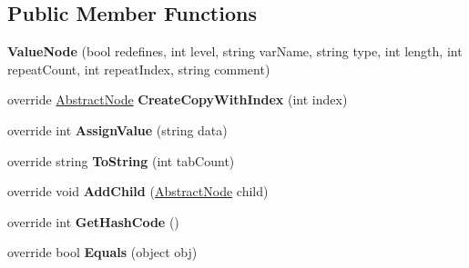 \subsection*{Public Member Functions}
\begin{DoxyCompactItemize}
\item 
{\bfseries Value\+Node} (bool redefines, int level, string var\+Name, string type, int length, int repeat\+Count, int repeat\+Index, string comment)\hypertarget{class__1920_parser_1_1_value_node_a5070c8591d364b184fb2f7a83098d1df}{}\label{class__1920_parser_1_1_value_node_a5070c8591d364b184fb2f7a83098d1df}

\item 
override \hyperlink{class__1920_parser_1_1_abstract_node}{Abstract\+Node} {\bfseries Create\+Copy\+With\+Index} (int index)\hypertarget{class__1920_parser_1_1_value_node_a9419a8beace8e6eda482fc3a403daf4b}{}\label{class__1920_parser_1_1_value_node_a9419a8beace8e6eda482fc3a403daf4b}

\item 
override int {\bfseries Assign\+Value} (string data)\hypertarget{class__1920_parser_1_1_value_node_a21bed203f8124c630e8b804ebcd7b728}{}\label{class__1920_parser_1_1_value_node_a21bed203f8124c630e8b804ebcd7b728}

\item 
override string {\bfseries To\+String} (int tab\+Count)\hypertarget{class__1920_parser_1_1_value_node_ae2b512cbab33936e1b02d7a7acf3b4bd}{}\label{class__1920_parser_1_1_value_node_ae2b512cbab33936e1b02d7a7acf3b4bd}

\item 
override void {\bfseries Add\+Child} (\hyperlink{class__1920_parser_1_1_abstract_node}{Abstract\+Node} child)\hypertarget{class__1920_parser_1_1_value_node_a035c2fb0a7af286a4718e7215b2925a1}{}\label{class__1920_parser_1_1_value_node_a035c2fb0a7af286a4718e7215b2925a1}

\item 
override int {\bfseries Get\+Hash\+Code} ()\hypertarget{class__1920_parser_1_1_value_node_a77ab8503cab6fa67bc948c6ac7bbff09}{}\label{class__1920_parser_1_1_value_node_a77ab8503cab6fa67bc948c6ac7bbff09}

\item 
override bool {\bfseries Equals} (object obj)\hypertarget{class__1920_parser_1_1_value_node_a748e3fdade8e115cc73babbe19646351}{}\label{class__1920_parser_1_1_value_node_a748e3fdade8e115cc73babbe19646351}

\end{DoxyCompactItemize}
